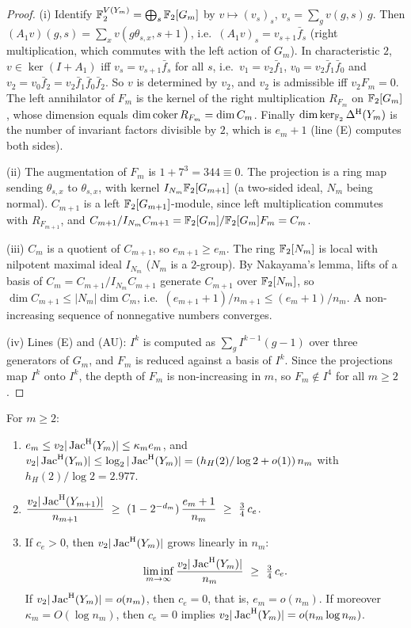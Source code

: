 \begin{proof}
(i) Identify $\mathbb{F}_2^{V(Y_m)}=\bigoplus_{s}\mathbb{F}_2[G_m]$ by $v\mapsto(v_s)_s$,
$v_s=\sum_gv(g,s)\,g$. Then $(A_1v)(g,s)=\sum_xv(g\theta_{s,x},s+1)$, i.e.\ $(A_1v)_s=v_{s+1}\bar f_s$
(right multiplication, which commutes with the left action of $G_m$). In characteristic $2$,
$v\in\ker(I+A_1)$ iff $v_s=v_{s+1}\bar f_s$ for all $s$, i.e.\ $v_1=v_2\bar f_1$,
$v_0=v_2\bar f_1\bar f_0$ and $v_2=v_0\bar f_2=v_2\bar f_1\bar f_0\bar f_2$. So $v$ is determined
by $v_2$, and $v_2$ is admissible iff $v_2F_m=0$. The left annihilator of $F_m$ is the kernel of
the right multiplication $R_{F_m}$ on $\mathbb{F}_2[G_m]$, whose dimension equals $\dim\operatorname{coker} R_{F_m}
=\dim C_m$. Finally $\dim\ker_{\mathbb{F}_2}\Delta^{\mathrm{H}}(Y_m)$ is the number of invariant factors divisible
by $2$, which is $e_m+1$ (line (E) computes both sides).

(ii) The augmentation of $F_m$ is $1+7^{3}=344\equiv0$. The projection is a ring map sending
$\theta_{s,x}$ to $\theta_{s,x}$, with kernel $I_{N_m}\mathbb{F}_2[G_{m+1}]$ (a two-sided ideal, $N_m$
being normal). $C_{m+1}$ is a left $\mathbb{F}_2[G_{m+1}]$-module, since left multiplication commutes
with $R_{F_{m+1}}$, and $C_{m+1}/I_{N_m}C_{m+1}=\mathbb{F}_2[G_m]/\mathbb{F}_2[G_m]F_m=C_m$.

(iii) $C_m$ is a quotient of $C_{m+1}$, so $e_{m+1}\ge e_m$. The ring $\mathbb{F}_2[N_m]$ is local with
nilpotent maximal ideal $I_{N_m}$ ($N_m$ is a $2$-group). By Nakayama's lemma, lifts of a basis
of $C_m=C_{m+1}/I_{N_m}C_{m+1}$ generate $C_{m+1}$ over $\mathbb{F}_2[N_m]$, so
$\dim C_{m+1}\le|N_m|\dim C_m$, i.e.\ $(e_{m+1}+1)/n_{m+1}\le(e_m+1)/n_m$. A non-increasing
sequence of nonnegative numbers converges.

(iv) Lines (E) and (AU): $I^{k}$ is computed as $\sum_gI^{k-1}(g-1)$ over three generators of
$G_m$, and $F_m$ is reduced against a basis of $I^{k}$. Since the projections map $I^{k}$ onto
$I^{k}$, the depth of $F_m$ is non-increasing in $m$, so $F_m\notin I^{4}$ for all $m\ge2$.
\end{proof}

\begin{theorem}[Bounds]\label{V3P6:thm:v2bounds}
For $m\ge2$:
\begin{enumerate}
\item[(i)] $e_m\le v_2|\operatorname{Jac}^{\mathrm{H}}(Y_m)|\le\kappa_me_m$, and
$v_2|\operatorname{Jac}^{\mathrm{H}}(Y_m)|\le\log_2|\operatorname{Jac}^{\mathrm{H}}(Y_m)|=(h_H(2)/\log2+o(1))\,n_m$ with $h_H(2)/\log2=2.977$.
\item[(ii)] $\dfrac{v_2|\JacH(Y_{m+1})|}{n_{m+1}}\ \ge\ (1-2^{-d_m})\,\dfrac{e_m+1}{n_m}\ \ge\
\tfrac34\,c_e$.
\item[(iii)] If $c_e>0$, then $v_2|\operatorname{Jac}^{\mathrm{H}}(Y_m)|$ grows linearly in $n_m$:
\[
\liminf_{m\to\infty}\frac{v_2|\JacH(Y_m)|}{n_m}\ \ge\ \tfrac34\,c_e .
\]
If $v_2|\operatorname{Jac}^{\mathrm{H}}(Y_m)|=o(n_m)$, then $c_e=0$, that is, $e_m=o(n_m)$. If moreover
$\kappa_m=O(\log n_m)$, then $c_e=0$ implies $v_2|\operatorname{Jac}^{\mathrm{H}}(Y_m)|=o(n_m\log n_m)$.
\end{enumerate}
\end{theorem}

